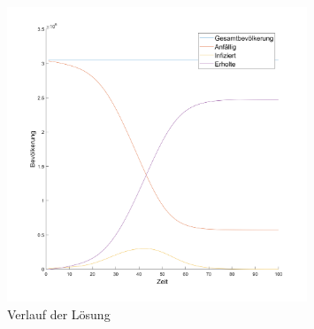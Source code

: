 \documentclass[11pt,a4paper]{article}
\begin{document}
\begin{figure}
\includegraphics[width=0.8\textwidth]{bild2-1}
\caption{Verlauf der L\"osung}
\end{figure}  
\end{document}
